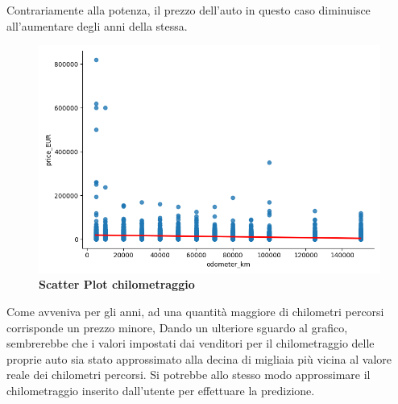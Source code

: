 Contrariamente alla potenza, il prezzo dell'auto in questo caso diminuisce all'aumentare degli anni della stessa.

\begin{figure}[H]
    \centering
    \includegraphics[scale=0.45]{Immagini/chilometraggio}
    \caption{\textbf{Scatter Plot chilometraggio}}
    \label{fig:odometer_km}
\end{figure}

Come avveniva per gli anni, ad una quantità maggiore di chilometri percorsi corrisponde un prezzo minore,
Dando un ulteriore sguardo al grafico, sembrerebbe che i valori impostati dai venditori per il chilometraggio delle proprie auto sia stato approssimato alla decina di migliaia più vicina al valore reale dei chilometri percorsi. Si potrebbe allo stesso modo approssimare il chilometraggio inserito dall'utente per effettuare la predizione.

